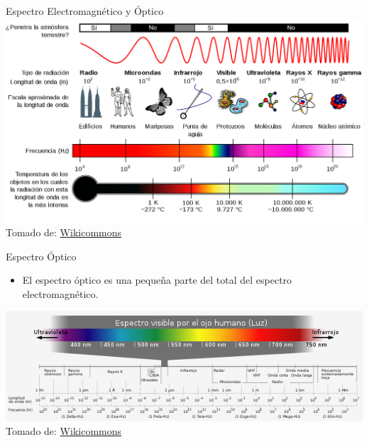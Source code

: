 \documentclass[aspectratio=169]{beamer}
\begin{document}
\begin{frame}{Espectro Electromagnético y Óptico}
            \centering
            \includegraphics[width = 0.8\linewidth]{fig/Optica/1200px-EM_Spectrum_Properties_es.svg.png}\\
            \tiny{Tomado de: \href{https://es.wikipedia.org/wiki/Espectro_visible}{Wikicommons}}
\end{frame}

\begin{frame}{Espectro Óptico}
            \begin{itemize}
                \item El espectro óptico es una pequeña parte del total del espectro electromagnético.
            \end{itemize}
            \centering
            
            \includegraphics[width = 1\linewidth]{fig/Optica/Espectro Visible.png}\\
            \tiny{Tomado de: \href{https://es.wikipedia.org/wiki/Espectro_electromagnético}{Wikicommons}}
\end{frame}
\end{document}
